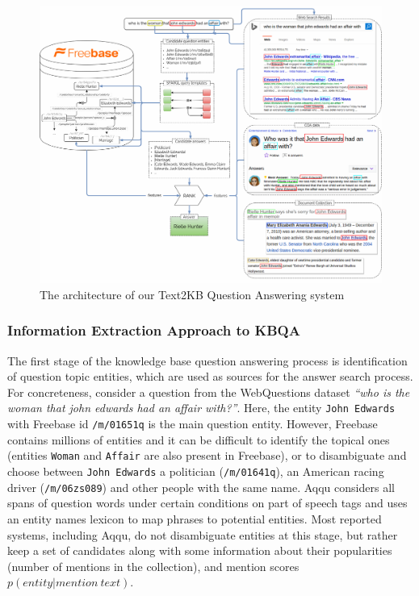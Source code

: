 \begin{figure}[!ht]
\centering
\includegraphics[width=\textwidth]{img/text2kb_model}
\caption{The architecture of our Text2KB Question Answering system}
\label{figure:text2kb:model}
\end{figure}

\subsubsection{Information Extraction Approach to KBQA}
\label{section:factoid:approaches:text2kb:baseline}

The first stage of the knowledge base question answering process is identification of question topic entities, which are used as sources for the answer search process.
For concreteness, consider a question from the WebQuestions dataset \textit{``who is the woman that john edwards had an affair with?''}.
Here, the entity \texttt{John Edwards} with Freebase id \texttt{/m/01651q} is the main question entity.
However, Freebase contains millions of entities and it can be difficult to identify the topical ones (\eg entities \texttt{Woman} and \texttt{Affair} are also present in Freebase), or to disambiguate and choose between \texttt{John Edwards} a politician (\texttt{/m/01641q}), an American racing driver (\texttt{/m/06zs089}) and other people with the same name.
Aqqu considers all spans of question words under certain conditions on part of speech tags and uses an entity names lexicon \cite{SPITKOVSKY12.266} to map phrases to potential entities.
Most reported systems, including Aqqu, do not disambiguate entities at this stage, but rather keep a set of candidates along with some information about their popularities (\eg number of mentions in the collection), and mention scores $p(entity| mention\ text)$.

